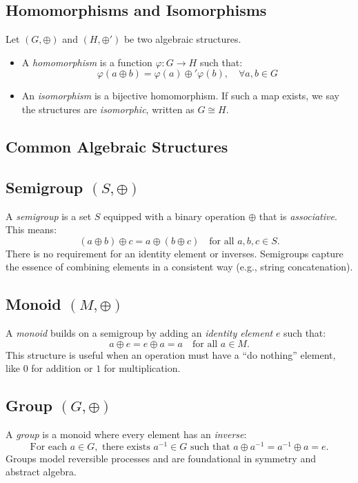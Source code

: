 \subsection{Homomorphisms and Isomorphisms}

Let \((G, \oplus)\) and \((H, \oplus')\) be two algebraic structures.

\begin{itemize}[label=\(-\)]
    \item A \emph{homomorphism} is a function \(\varphi: G \rightarrow H\) such that:
    \[
    \varphi(a \oplus b) = \varphi(a) \oplus' \varphi(b), \quad \forall a,b \in G
    \]
    
    \item An \emph{isomorphism} is a bijective homomorphism. If such a map exists, we say the structures are \emph{isomorphic}, written as \(G \cong H\).
\end{itemize}

\subsection{Common Algebraic Structures}

\subsection{Semigroup \((S, \oplus)\)}
A \emph{semigroup} is a set \(S\) equipped with a binary operation \(\oplus\) that is \emph{associative}. This means:
\[
(a \oplus b) \oplus c = a \oplus (b \oplus c) \quad \text{for all } a, b, c \in S.
\]
There is no requirement for an identity element or inverses. Semigroups capture the essence of combining elements in a consistent way (e.g., string concatenation).

\subsection{Monoid \((M, \oplus)\)}
A \emph{monoid} builds on a semigroup by adding an \emph{identity element} \(e\) such that:
\[
a \oplus e = e \oplus a = a \quad \text{for all } a \in M.
\]
This structure is useful when an operation must have a “do nothing” element, like \(0\) for addition or \(1\) for multiplication.

\subsection{Group \((G, \oplus)\)}
A \emph{group} is a monoid where every element has an \emph{inverse}:
\[
\text{For each } a \in G, \text{ there exists } a^{-1} \in G \text{ such that } a \oplus a^{-1} = a^{-1} \oplus a = e.
\]
Groups model reversible processes and are foundational in symmetry and abstract algebra.

